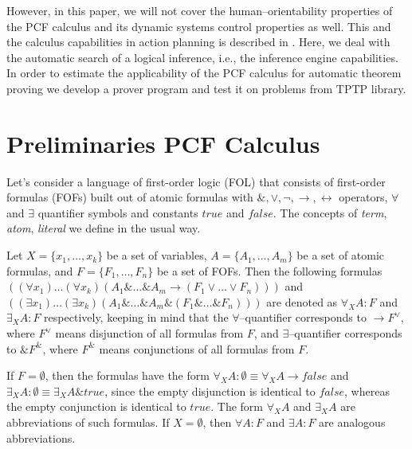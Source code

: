 \documentclass[runningheads,a4paper]{llncs}
\begin{document}
However, in this paper, we will not cover the human--orientability properties of the PCF calculus and its dynamic systems control properties as well.  This and the calculus capabilities in action planning is described in \cite{ICDS2000}.   Here, we deal with the automatic search of a logical inference, i.e., the inference engine capabilities.  In order to estimate the applicability of the PCF calculus for automatic theorem proving we develop a prover program and test it on problems from TPTP library.



\section{Preliminaries PCF Calculus}

Let's consider a language of first-order logic (FOL) that consists of first-order formulas (FOFs) built out of atomic formulas with $\&, \vee, \neg, \rightarrow, \leftrightarrow$ operators, $\forall$ and $\exists$ quantifier symbols and constants $true$ and $false$.  The concepts of \emph{term}, \emph{atom}, \emph{literal} we define in the usual way.

Let $X = \{x_1,\ldots,x_k\}$ be a set of variables, $A = \{A_1,\ldots,A_m\}$ be a set of atomic formulas, and $F = \{F_1,\ldots,F_n\}$ be a set of FOFs. Then the following formulas $((\forall x_1) \ldots (\forall x_k) (A_1 \& \ldots \& A_m \rightarrow (F_1 \vee \ldots \vee F_n)))$ and $((\exists x_1) \ldots (\exists x_k) (A_1 \& \ldots \& A_m \& (F_1 \& \ldots \& F_n)))$ are denoted as  $\forall_XA\colon F$ and $\exists_XA\colon F$ respectively, keeping in mind that the $\forall$--quantifier corresponds to $\rightarrow F^{\vee}$, where $F^{\vee}$ means disjunction of all formulas from $F$, and $\exists$--quantifier corresponds to $\& F^{\&}$, where $F^{\&}$ means conjunctions of all formulas from $F$.

If $F = \emptyset$, then the formulas have the form $\forall_XA\colon\emptyset \equiv \forall_XA \rightarrow false$ and $\exists_XA\colon\emptyset \equiv \exists_XA \& true$, since the empty disjunction is identical to $false$, whereas the empty conjunction is identical to $true$.  The form $\forall_XA$ and $\exists_XA$ are abbreviations of such formulas.  If $X = \emptyset$, then $\forall A\colon F$ and $\exists A\colon F$ are analogous abbreviations.
\end{document}
